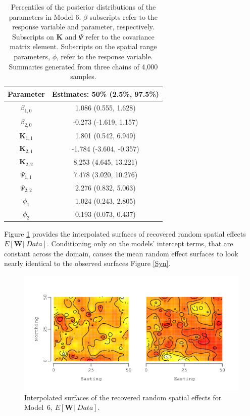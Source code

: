 \documentclass[a4paper]{article}
\newcommand{\bK}{\textbf{K}}
\newcommand{\bW}{\textbf{W}}
\begin{document}
\begin{table}[!h]
\begin{center}
\caption{Percentiles of the posterior distributions of the parameters in Model 6.  $\beta$ subscripts refer to the response variable and parameter, respectively.  Subscripts on $\bK$ and $\Psi$ refer to the covariance matrix element.  Subscripts on the spatial range parameters, $\phi$, refer to the response variable. Summaries generated from three chains of 4,000 samples.} \label{SyntheticEsts}
\begin{tabular}
[c]{|c|c|}%
\hline Parameter & Estimates: 50\% (2.5\%, 97.5\%)\\\hline
$\beta_{1,0}$ &  1.086 (0.555, 1.628)\\
$\beta_{2,0}$ &  -0.273 (-1.619, 1.157)\\
\hline
$\bK_{1,1}$ &  1.801 (0.542, 6.949)\\
$\bK_{2,1}$ & -1.784 (-3.604, -0.357)\\
$\bK_{2,2}$ &  8.253 (4.645, 13.221)\\
\hline
$\Psi_{1,1}$ & 7.478 (3.020, 10.276)\\
$\Psi_{2,2}$ & 2.276 (0.832, 5.063)\\
\hline
$\phi_{1}$ & 1.024 (0.243, 2.805)\\
$\phi_{2}$ & 0.193 (0.073, 0.437)\\
\hline
\end{tabular}
\end{center}
\end{table}

Figure \ref{SynWSurf} provides the interpolated surfaces of recovered
random spatial effects $E[\bW |\; Data]$.  Conditioning only on the
models' intercept terms, that are constant across the domain,
causes the mean random effect surfaces to look nearly identical to
the observed surfaces Figure \ref{Syn}.

\begin{figure}[h!]
\centering
\includegraphics[width=14cm]{synWSurf.png}
\caption{Interpolated surfaces of the recovered random spatial effects for Model~6, $E[\bW |\; Data]$.}
\label{SynWSurf}
\end{figure}
\end{document}
